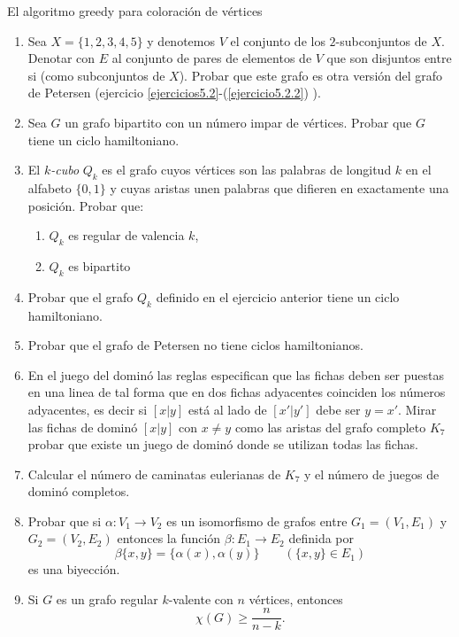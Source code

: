 \begin{section}{El algoritmo greedy para coloración de vértices}
\begin{enumerate}
\item Sea $X=\{1,2,3,4,5\}$ y denotemos $V$ el conjunto de los
$2$-subconjuntos de $X$. Denotar con $E$ al conjunto de pares de
elementos de $V$ que son disjuntos entre si (como subconjuntos de
$X$). Probar que este grafo es otra versión del grafo de Petersen
(ejercicio \ref{ejercicios5.2}-(\ref{ejercicio5.2.2}) ).

\item Sea $G$ un grafo bipartito con un número impar de vértices. Probar
que $G$ tiene un ciclo hamiltoniano.

\item El {\em $k$-cubo} $Q_k$ es el grafo cuyos vértices son las
palabras de longitud $k$ en el alfabeto $\{0,1\}$ y cuyas aristas
unen palabras que difieren en exactamente una posición. Probar
que:
\begin{enumerate}
	\item $Q_k$ es regular de valencia $k$,
	
	\item $Q_k$ es bipartito
\end{enumerate}

\item Probar que el grafo $Q_k$ definido en el ejercicio anterior tiene
un ciclo hamiltoniano.

\item Probar que el grafo de Petersen no tiene ciclos hamiltonianos.

\item En el juego del dominó las reglas especifican que las fichas deben
ser puestas en una linea de tal forma que en dos fichas adyacentes
coinciden los números adyacentes, es decir si $[x|y]$ está al lado
de $[x'|y']$ debe ser $y=x'$. Mirar las fichas de dominó $[x|y]$
con $x\not=y$ como las aristas del grafo completo $K_7$ probar que
existe un juego de dominó donde se utilizan todas las fichas.

\item Calcular el número de caminatas eulerianas de $K_7$ y el número de
juegos de dominó completos.

\item Probar que si $\alpha: V_1 \to  V_2$ es un isomorfismo de grafos
entre $G_1=(V_1,E_1)$ y  $G_2=(V_2,E_2)$ entonces la función
$\beta:E_1 \to  E_2$ definida por
$$
\beta\{x,y\} = \{\alpha(x),\alpha(y)\} \qquad (\{x,y\} \in E_1)
$$
es una biyección.

\item Si $G$ es un grafo regular $k$-valente con $n$ vértices, entonces
$$
\chi(G)\ge \frac{n}{n-k}.
$$


\end{enumerate}
\end{section}
